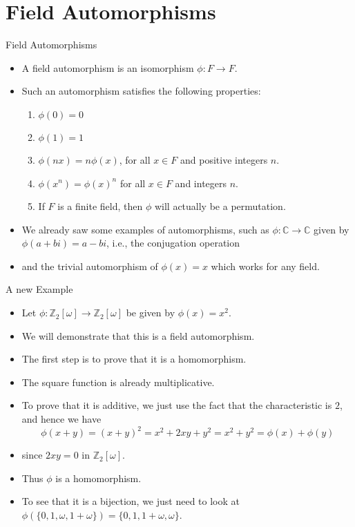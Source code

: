 \documentclass[ %
 10pt, xcolor={dvipsnames,svgnames,x11names,hyperref},
   hyperref={colorlinks=true,citecolor=green,linkcolor=DarkRed,urlcolor=ProcessBlue,anchorcolor=blue}
  ]{beamer}
\newenvironment{stepitemize}{\begin{itemize}[<+->]}{\end{itemize} }
\newcommand{\Z}{\mathbb{Z}}
\newcommand{\C}{\mathbb{C}}
\begin{document}
\section{Field Automorphisms}
\begin{frame}{Field Automorphisms}
\begin{stepitemize}
\item A field automorphism is an isomorphism $\phi:F\rightarrow F$.
\item Such an automorphism satisfies the following properties:
\begin{enumerate}
    \item $\phi(0)=0$
    \item $\phi(1)=1$
    \item $\phi(nx)=n\phi(x)$, for all $x\in F$ and positive integers $n$.
    \item $\phi(x^n)=\phi(x)^n$ for all $x\in F$ and integers $n$.
    \item If $F$ is a finite field, then $\phi$ will actually be a permutation.

\end{enumerate}
\item We already saw some examples of automorphisms, such as $\phi:\C\rightarrow \C$ given by $\phi(a+bi)=a-bi$, i.e., the conjugation operation
\item and the trivial automorphism of $\phi(x)=x$ which works for any field.
\end{stepitemize}
\end{frame}

\begin{frame}{A new Example}
\begin{stepitemize}
    \item Let $\phi:\Z_2[\omega]\rightarrow \Z_2[\omega]$ be given by $\phi(x)=x^2$.
    \item We will demonstrate that this is a field automorphism.

\item The first step is to prove that it is a homomorphism. \item The square function is already multiplicative.
\item To prove that it is additive, we just use the fact that the characteristic is $2$, and hence we have
$$\phi(x+y) = (x+y)^2=x^2+2xy+y^2=x^2+y^2 = \phi(x)+\phi(y)$$
\item since $2xy=0$ in $\Z_2[\omega]$.
\item Thus $\phi$ is a homomorphism.
\item To see that it is a bijection, we just need to look at $\phi(\{0,1,\omega, 1+\omega\}) = \{0,1, 1+\omega, \omega\}$.

\end{stepitemize}
\end{frame}
\end{document}
